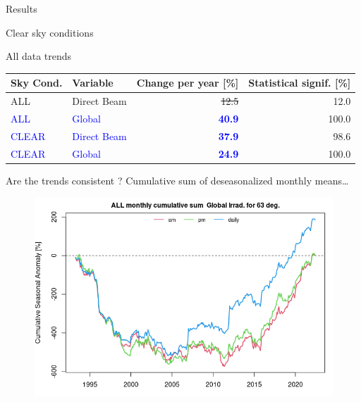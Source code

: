 \documentclass[
  ignorenonframetext,
]{beamer}
\begin{document}
\begin{frame}{Results}
\begin{block}{Clear sky conditions}
\begin{figure}
\begin{minipage}[t]{0.50\linewidth}
{}

\end{minipage}%

\end{figure}
\end{block}

\begin{block}{All data trends}
\protect\hypertarget{all-data-trends}{}
\begin{tabular}{>{}l|>{}l|>{}r|r}
\hline
Sky Cond. & Variable & Change per year [\%] & Statistical signif. [\%]\\
\hline
\textcolor{0}{ALL} & \textcolor{0}{Direct Beam} & \textcolor{0}{\sout{12.5}} & 12.0\\
\hline
\textcolor{blue}{ALL} & \textcolor{blue}{Global} & \textcolor{blue}{\textbf{40.9}} & 100.0\\
\hline
\textcolor{blue}{CLEAR} & \textcolor{blue}{Direct Beam} & \textcolor{blue}{\textbf{37.9}} & 98.6\\
\hline
\textcolor{blue}{CLEAR} & \textcolor{blue}{Global} & \textcolor{blue}{\textbf{24.9}} & 100.0\\
\hline
\end{tabular}

\end{block}

\begin{block}{Are the trends consistent ?}
\protect\hypertarget{are-the-trends-consistent}{}
Cumulative sum of deseasonalized monthly means\ldots{}

\begin{figure}

\begin{minipage}[t]{0.50\linewidth}

{\centering 

\includegraphics[width=4.48in,height=\textheight]{images/DHI_GHI_3_trends_consistency_files/figure-html/cumulativesums-1.png}

}
\end{minipage}
\end{figure}
\end{block}
\end{frame}
\end{document}
